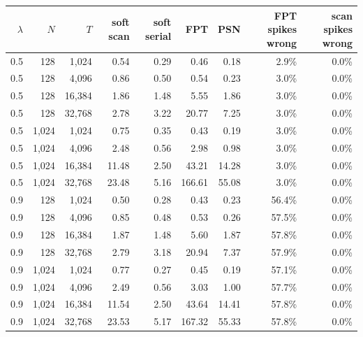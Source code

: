\begin{tabular}{rrrrrrrrr}
\toprule
$\lambda$ & $N$ & $T$ & soft scan & soft serial & FPT & PSN & FPT spikes wrong & scan spikes wrong\\
\midrule
0.5 & 128 & 1{,}024 & 0.54 & 0.29 & 0.46 & 0.18 & 2.9\% & 0.0\%\\
0.5 & 128 & 4{,}096 & 0.86 & 0.50 & 0.54 & 0.23 & 3.0\% & 0.0\%\\
0.5 & 128 & 16{,}384 & 1.86 & 1.48 & 5.55 & 1.86 & 3.0\% & 0.0\%\\
0.5 & 128 & 32{,}768 & 2.78 & 3.22 & 20.77 & 7.25 & 3.0\% & 0.0\%\\
0.5 & 1{,}024 & 1{,}024 & 0.75 & 0.35 & 0.43 & 0.19 & 3.0\% & 0.0\%\\
0.5 & 1{,}024 & 4{,}096 & 2.48 & 0.56 & 2.98 & 0.98 & 3.0\% & 0.0\%\\
0.5 & 1{,}024 & 16{,}384 & 11.48 & 2.50 & 43.21 & 14.28 & 3.0\% & 0.0\%\\
0.5 & 1{,}024 & 32{,}768 & 23.48 & 5.16 & 166.61 & 55.08 & 3.0\% & 0.0\%\\
0.9 & 128 & 1{,}024 & 0.50 & 0.28 & 0.43 & 0.23 & 56.4\% & 0.0\%\\
0.9 & 128 & 4{,}096 & 0.85 & 0.48 & 0.53 & 0.26 & 57.5\% & 0.0\%\\
0.9 & 128 & 16{,}384 & 1.87 & 1.48 & 5.60 & 1.87 & 57.8\% & 0.0\%\\
0.9 & 128 & 32{,}768 & 2.79 & 3.18 & 20.94 & 7.37 & 57.9\% & 0.0\%\\
0.9 & 1{,}024 & 1{,}024 & 0.77 & 0.27 & 0.45 & 0.19 & 57.1\% & 0.0\%\\
0.9 & 1{,}024 & 4{,}096 & 2.49 & 0.56 & 3.03 & 1.00 & 57.7\% & 0.0\%\\
0.9 & 1{,}024 & 16{,}384 & 11.54 & 2.50 & 43.64 & 14.41 & 57.8\% & 0.0\%\\
0.9 & 1{,}024 & 32{,}768 & 23.53 & 5.17 & 167.32 & 55.33 & 57.8\% & 0.0\%\\
\bottomrule
\end{tabular}
